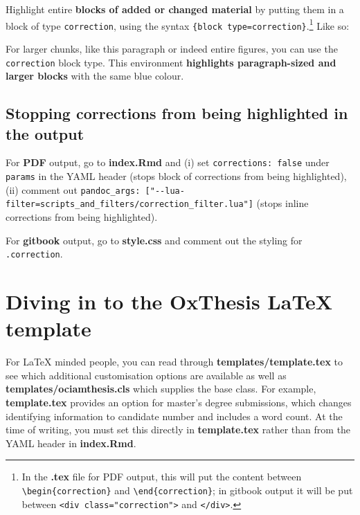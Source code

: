 \documentclass[a4paper, twoside]{templates/ociamthesis}
\begin{document}
Highlight entire \textbf{blocks of added or changed material} by putting them in a block of type \texttt{correction}, using the syntax \texttt{\textasciigrave{}\textasciigrave{}\textasciigrave{}\{block\ type=\textquotesingle{}correction\textquotesingle{}\}}.\footnote{In the \textbf{.tex} file for PDF output, this will put the content between \texttt{\textbackslash{}begin\{correction\}} and \texttt{\textbackslash{}end\{correction\}}; in gitbook output it will be put between \texttt{\textless{}div\ class="correction"\textgreater{}} and \texttt{\textless{}/div\textgreater{}}.}
Like so:

\begin{correction}
For larger chunks, like this paragraph or indeed entire figures, you can
use the \texttt{correction} block type. This environment
\textbf{highlights paragraph-sized and larger blocks} with the same blue
colour.
\end{correction}

\hypertarget{stopping-corrections-from-being-highlighted-in-the-output}{%
\subsection{Stopping corrections from being highlighted in the output}\label{stopping-corrections-from-being-highlighted-in-the-output}}

For \textbf{PDF} output, go to \textbf{index.Rmd} and (i) set \texttt{corrections:\ false} under \texttt{params} in the YAML header (stops block of corrections from being highlighted), (ii) comment out \texttt{pandoc\_args:\ {[}"-\/-lua-filter=scripts\_and\_filters/correction\_filter.lua"{]}} (stops inline corrections from being highlighted).

For \textbf{gitbook} output, go to \textbf{style.css} and comment out the styling for \texttt{.correction}.

\hypertarget{diving-in-to-the-oxthesis-latex-template}{%
\section{Diving in to the OxThesis LaTeX template}\label{diving-in-to-the-oxthesis-latex-template}}

For LaTeX minded people, you can read through \textbf{templates/template.tex} to see which additional customisation options are available as well as \textbf{templates/ociamthesis.cls} which supplies the base class.
For example, \textbf{template.tex} provides an option for master's degree submissions, which changes identifying information to candidate number and includes a word count.
At the time of writing, you must set this directly in \textbf{template.tex} rather than from the YAML header in \textbf{index.Rmd}.
\end{document}
